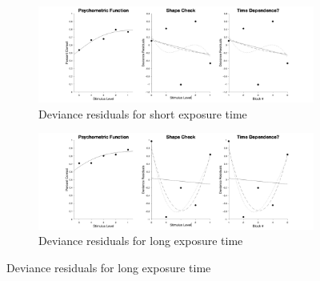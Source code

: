 \documentclass{article}
\begin{document}
\begin{figure}[!hb]
    \begin{subfigure}{\textwidth}
        \centering
        \includegraphics[width = \linewidth]{Thesis/plots/gof/cutNo/cutNo_eb_short_deviance.png}
        \caption{Deviance residuals for short exposure time}
    \end{subfigure}
    
    \begin{subfigure}{\textwidth}
        \centering
        \includegraphics[width = \linewidth]{Thesis/plots/gof/cutNo/cutNo_eb_long_deviance.png}
        \caption{Deviance residuals for long exposure time}
    \end{subfigure}
\end{figure}

\clearpage
\end{document}
